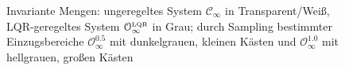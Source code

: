 \begin{figure}[ht]
	\def\xlabel{$\Delta x$ in $\unit{m}$}
	\def\vlabel{$\Delta v$ in $\unitfrac{m}{s}$}	
	\def\alabel{$a_\text{ego}$ in $\unitfrac{m}{s^2}$}	
	
		\!\!\!\!\!\!\!\!\!\!\!\!
	\def\alabel{$\mathcal{C}_\infty$}
	\def\blabel{$\mathcal{O}_\infty^{\text{\tiny LQR}}$}
	\def\clabel{$\mathcal{O}_\infty^{0.5}$}
	\def\dlabel{$\mathcal{O}_\infty^{1.0}$}
	\def\elabel{ICS}
	\def\flabel{$\mathcal{X}$}
	
    \caption[Invariante Mengen für das ACC-Beispiel]{Invariante Mengen: ungeregeltes System $\mathcal C_\infty$ in Transparent/Weiß, LQR-geregeltes System $\mathcal{O}_\infty^{\text{\tiny LQR}}$ in Grau; durch Sampling bestimmter Einzugsbereiche $\mathcal{O}_\infty^{0.5}$ mit dunkelgrauen, kleinen Kästen und $\mathcal{O}_\infty^{1.0}$ mit hellgrauen, großen Kästen}
\end{figure}


